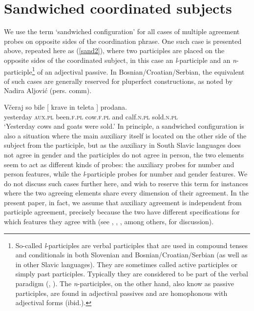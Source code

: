 \documentclass[output=paper
,modfonts
,nonflat]{langsci/langscibook}
\begin{document}
\section{Sandwiched coordinated subjects}\label{sec:sandwconf}

We use the term `sandwiched configuration' for all cases of multiple agreement probes on opposite sides of the coordination phrase. One such case is presented above, repeated here as (\ref{sand2}), where two participles are placed on the opposite sides of the coordinated subject, in this case an \textit{l}-participle and an \textit{n}-participle\footnote{So-called \textit{l}-participles are verbal participles that are used in compound tenses and conditionals in both Slovenian and Bosnian/Croatian/Serbian (as well as in other Slavic languages). They are sometimes called active participles or simply past participles. Typically they are considered to be part of the verbal paradigm (\citealt{browne:93}, \citealt{priestly:93}). The \textit{n}-participles, on the other hand, also know as passive participles, are found in adjectival passives and are homophonous with adjectival forms (ibid.).} of an adjectival passive. In Bosnian/Croatian/Serbian, the equivalent of such cases are generally reserved for pluperfect constructions, as noted by Nadira Aljović (pers. comm).

\ea \label{sand2}
\gll Včeraj      so    bile       [ krave    in    teleta ]    prodana.\\
yesterday \textsc{aux.pl} been.\textsc{f.pl} {} cow.\textsc{f.pl} and calf.\textsc{n.pl} {}   sold.\textsc{n.pl} \\
\glt `Yesterday cows and goats were sold.'
\z
In principle, a sandwiched configuration is also a situation where the main auxiliary itself is located on the other side of the subject from the participle, but as the auxiliary in South Slavic languages does not agree in gender and the participles do not agree in person, the two elements seem to act as different kinds of probes: the auxiliary probes for number and person features, while the \textit{l}-participle probes for number and gender features. We do not discuss such cases  further here, and wish to reserve this term for instances where the two agreeing elements share every dimension of their agreement. In the present paper, in fact, we assume that auxiliary agreement is independent from participle agreement, precisely because the two have different specifications for which features they agree with (see \citealt{dalessandro:07}, \citealt{lopez:07}, \citealt{puskar:17}, among others, for discussion).
\end{document}
